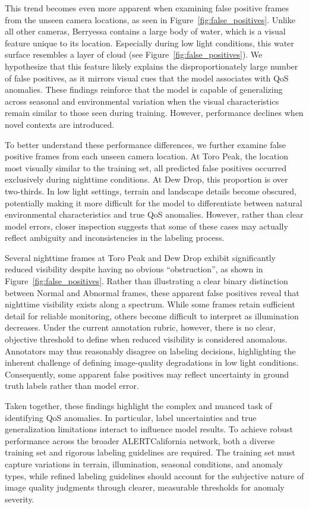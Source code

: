 \documentclass{article}
\begin{document}
This trend becomes even more apparent when examining false positive frames from the unseen camera locations, as seen in Figure~\ref{fig:false_positives}. Unlike all other cameras, Berryessa contains a large body of water, which is a visual feature unique to its location. Especially during low light conditions, this water surface resembles a layer of cloud (see Figure~\ref{fig:false_positives}). We hypothesize that this feature likely explains the disproportionately large number of false positives, as it mirrors visual cues that the model associates with \ac{QoS} anomalies. These findings reinforce that the model is capable of generalizing across seasonal and environmental variation when the visual characteristics remain similar to those seen during training. However, performance declines when novel contexts are introduced. 

To better understand these performance differences, we further examine false positive frames from each unseen camera location. At Toro Peak, the location most visually similar to the training set, all predicted false positives occurred exclusively during nighttime conditions. At Dew Drop, this proportion is over two-thirds. In low light settings, terrain and landscape details become obscured, potentially making it more difficult for the model to differentiate between natural environmental characteristics and true \ac{QoS} anomalies. However, rather than clear model errors, closer inspection suggests that some of these cases may actually reflect ambiguity and inconsistencies in the labeling process. 

Several nighttime frames at Toro Peak and Dew Drop exhibit significantly reduced visibility despite having no obvious ``obstruction”, as shown in Figure~\ref{fig:false_positives}. Rather than illustrating a clear binary distinction between Normal and Abnormal frames, these apparent false positives reveal that nighttime visibility exists along a spectrum. While some frames retain sufficient detail for reliable monitoring, others become difficult to interpret as illumination decreases. Under the current annotation rubric, however, there is no clear, objective threshold to define when reduced visibility is considered anomalous. Annotators may thus reasonably disagree on labeling decisions, highlighting the inherent challenge of defining image-quality degradations in low light conditions. Consequently, some apparent false positives may reflect uncertainty in ground truth labels rather than model error. 

Taken together, these findings highlight the complex and nuanced task of identifying \ac{QoS} anomalies. In particular, label uncertainties and true generalization limitations interact to influence model results. To achieve robust performance across the broader ALERTCalifornia network, both a diverse training set and rigorous labeling guidelines are required. The training set must capture variations in terrain, illumination, seasonal conditions, and anomaly types, while refined labeling guidelines should account for the subjective nature of image quality judgments through clearer, measurable thresholds for anomaly severity. 
\end{document}
